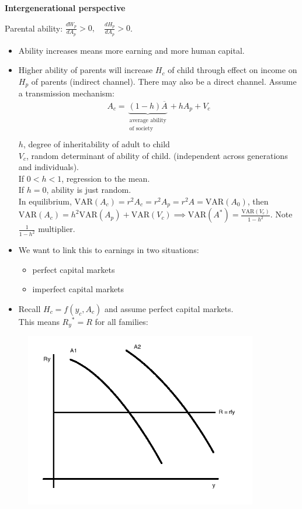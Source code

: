 \documentclass[14pt,notitlepage]{article}
\begin{document}
\textbf{Intergenerational perspective}

Parental ability: \quad $\frac{dW_p}{dA_p} > 0, \quad \frac{dH_p}{dA_p} > 0$.
\begin{itemize}
\item Ability increases means more earning and more human capital.
\item Higher ability of parents will increase $H_c$  of child through effect on income on $H_p$ of parents (indirect channel). There may also be a direct channel. Assume a transmission mechanism:
\begin{align*}
A_c = \underbrace{(1-h) \overline{A}}_{\substack{\text{average ability} \\ \text{of society}}} + h A_p + V_c \\
\end{align*}
$h$, degree of inheritability of adult to child \\
$V_c$, random determinant of ability of child. (independent across generations and individuals). \\
If $0<h<1$, regression to the mean. \\
If $h=0$, ability is just random. \\
In equilibrium, $\text{VAR}(A_c) = r^2 A_c = r^2 A_p = r^2 A = \text{VAR}(A_0)$, then \\
$\text{VAR}(A_c) = h^2 \text{VAR}(A_p) + \text{VAR}(V_c) \implies \text{VAR}(A^*) = \frac{\text{VAR}(V_c)}{1 - h^2}$. Note $\frac{1}{1-h^2}$ multiplier.
\item We want to link this to earnings in two situations:
    \begin{itemize}
    \item perfect capital markets
    \item imperfect capital markets
    \end{itemize}
\item Recall $H_c = f(y_c, A_c)$ and assume perfect capital markets. \\
This means ${R_y}^* = R$ for all families:
\end{itemize}

\begin{center}
\begin{figure}[H] 
\caption{}
\centering
\includegraphics[width=4in, height=3in]{plot7.png}
\end{figure}
\end{center}
\end{document}

